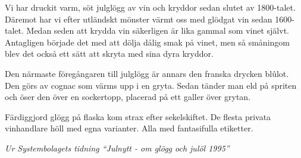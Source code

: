 \vspace{10pt}
\setlength{\parindent}{15pt}
Vi har druckit varm, söt julglögg av vin och kryddor sedan slutet av
1800-talet. Däremot har vi efter utländskt mönster värmt oss med
glödgat vin sedan 1600-talet. Medan seden att krydda vin säkerligen är
lika gammal som vinet självt. Antagligen började det med att dölja
dålig smak på vinet, men så småningom blev det också ett sätt att
skryta med sina dyra kryddor.

Den närmaste föregångaren till julglögg är annars den franska drycken
blûlot. Den görs av cognac som värms upp i en gryta. Sedan tänder man
eld på spriten och öser den över en sockertopp, placerad på ett galler
över grytan.

Färdiggjord glögg på flaska kom strax efter sekelskiftet. De flesta
privata vinhandlare höll med egna varianter. Alla med fantasifulla
etiketter.\par
\setlength{\parindent}{0pt}
\vspace{10pt}
{\footnotesize\textit{Ur Systembolagets tidning ``Julnytt - om glögg
och julöl 1995''}}
